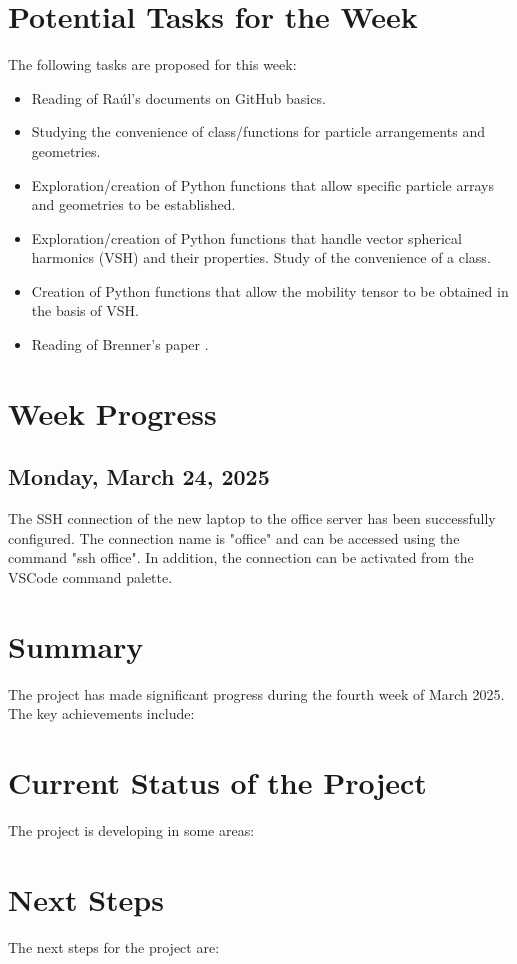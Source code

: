 \documentclass[12pt]{article}
\begin{document}
\section{Potential Tasks for the Week}
The following tasks are proposed for this week:
\begin{itemize}
    \item Reading of Raúl's documents on GitHub basics.
    \item Studying the convenience of class/functions for particle arrangements and geometries.
    \item Exploration/creation of Python functions that allow specific particle arrays and geometries to be established.
    \item Exploration/creation of Python functions that handle vector spherical harmonics (VSH) and their properties. Study of the convenience of a class.
    \item Creation of Python functions that allow the mobility tensor to be obtained in the basis of VSH.
    \item Reading of Brenner's paper \cite{BRENNER1961242}.
\end{itemize}

\section{Week Progress}

\subsection{Monday, March 24, 2025}
The SSH connection of the new laptop to the office server
has been successfully configured. The connection name is
"office" and can be accessed using the command "ssh office".
In addition, the connection can be activated from the VSCode
command palette.

\section{Summary}
The project has made significant progress during the fourth
week of March 2025. The key achievements include:


\section {Current Status of the Project}
The project is developing in some areas:


\section{Next Steps}
The next steps for the project are:

\printbibliography
\end{document}
